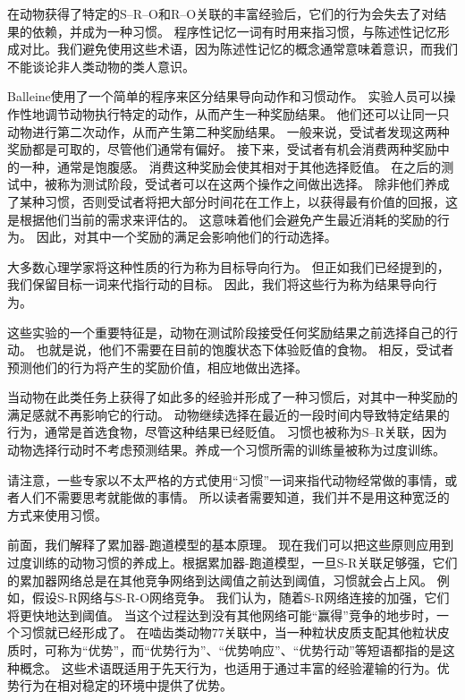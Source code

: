 在动物获得了特定的S–R–O和R–O关联的丰富经验后，它们的行为会失去了对结果的依赖，并成为一种习惯。
程序性记忆一词有时用来指习惯，与陈述性记忆形成对比。我们避免使用这些术语，因为陈述性记忆的概念通常意味着意识，而我们不能谈论非人类动物的类人意识。\par


Balleine\cite{balleine2003effect}使用了一个简单的程序来区分结果导向动作和习惯动作。
实验人员可以操作性地调节动物执行特定的动作，从而产生一种奖励结果。
他们还可以让同一只动物进行第二次动作，从而产生第二种奖励结果。
一般来说，受试者发现这两种奖励都是可取的，尽管他们通常有偏好。
接下来，受试者有机会消费两种奖励中的一种，通常是饱腹感。
消费这种奖励会使其相对于其他选择贬值。
在之后的测试中，被称为测试阶段，受试者可以在这两个操作之间做出选择。
除非他们养成了某种习惯，否则受试者将把大部分时间花在工作上，以获得最有价值的回报，这是根据他们当前的需求来评估的。
这意味着他们会避免产生最近消耗的奖励的行为。
因此，对其中一个奖励的满足会影响他们的行动选择。\par


大多数心理学家将这种性质的行为称为目标导向行为。
但正如我们已经提到的，我们保留目标一词来代指行动的目标。
因此，我们将这些行为称为结果导向行为。\par


这些实验的一个重要特征是，动物在测试阶段接受任何奖励结果之前选择自己的行动。
也就是说，他们不需要在目前的饱腹状态下体验贬值的食物。
相反，受试者预测他们的行为将产生的奖励价值，相应地做出选择。\par


当动物在此类任务上获得了如此多的经验并形成了一种习惯后，对其中一种奖励的满足感就不再影响它的行动。
动物继续选择在最近的一段时间内导致特定结果的行为，通常是首选食物，尽管这种结果已经贬值。
习惯也被称为S–R关联，因为动物选择行动时不考虑预测结果。养成一个习惯所需的训练量被称为过度训练。\par


请注意，一些专家以不太严格的方式使用“习惯”一词来指代动物经常做的事情，或者人们不需要思考就能做的事情。
所以读者需要知道，我们并不是用这种宽泛的方式来使用习惯。\par


前面，我们解释了累加器-跑道模型的基本原理。
现在我们可以把这些原则应用到过度训练的动物习惯的养成上。根据累加器-跑道模型，一旦S-R关联足够强，它们的累加器网络总是在其他竞争网络到达阈值之前达到阈值，习惯就会占上风。
例如，假设S-R网络与S-R-O网络竞争。
我们认为，随着S-R网络连接的加强，它们将更快地达到阈值。
当这个过程达到没有其他网络可能“赢得”竞争的地步时，一个习惯就已经形成了。
在啮齿类动物77关联中，当一种粒状皮质支配其他粒状皮质时，可称为“优势”，而“优势行为”、“优势响应”、“优势行动”等短语都指的是这种概念。
这些术语既适用于先天行为，也适用于通过丰富的经验灌输的行为。优势行为在相对稳定的环境中提供了优势。\par


